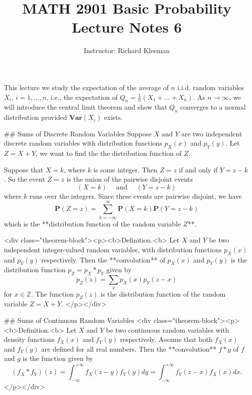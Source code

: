 


\title{MATH 2901 Basic Probability Lecture Notes 6}
\author{Instructor: Richard Kleeman}
\date{}
\maketitle


This lecture we study the expectation of the average of $n$ i.i.d. random variables $X_i$, $i=1,\dots, n$, i.e., the expectation of $Q_n = \frac{1}{n} (X_1 + \dots + X_n)$. As $n \to \infty$, we will introduce the central limit theorem and show that $Q_n$ converges to a normal distribution provided $\mathbf{Var}(X_i)$ exists.


## Sums of Discrete Random Variables
Suppose $X$ and $Y$ are two independent discrete random variables with distribution functions $p_X(x)$ and $p_Y(y)$. Let $Z = X + Y$, we want to find the the distribution function of $Z$. 

Suppose that $X = k$, where $k$ is some integer. Then $Z = z$ if and only if $Y = z-k$. So the event $Z = z$ is the union of the pairwise disjoint events
$$\begin{equation}
    (X=k) \quad  \text { and } \quad  (Y=z-k)
\end{equation}$$
where $k$ runs over the integers. Since these events are pairwise disjoint, we have
$$$$\begin{equation}
    \label{eq:6.1}
    \tag{6-1}
    \mathbf{P}(Z=z)=\sum_{k=-\infty}^{\infty} \mathbf{P}(X=k)  \mathbf{P}(Y=z-k)
\end{equation}$$$$
which is the **distribution function of the random variable $Z$**.

<div class="theorem-block"><p><b>Definition.<b> 
Let $X$ and $Y$ be two independent integer-valued random variables, with distribution functions $p_X(x)$ and $p_Y(y)$ respectively. Then the **convolution** of $p_X(x)$ and $p_Y(y)$ is the distribution function $p_Z = p_X * p_Y$ given by
$$\begin{equation}
    p_Z(z) = \sum_{x} p_X(x) p_Y(z-x)
\end{equation}$$
for $x\in \mathbb{Z}$. The function $p_Z(z)$ is the distribution function of the random variable $Z = X + Y$.
</p></div>


## Sums of Continuous Random Variables
<div class="theorem-block"><p><b>Definition.<b> 
Let $X$ and $Y$ be two continuous random variables with density functions $f_X(x)$ and $f_Y(y)$ respectively. Assume that both $f_X(x)$ and $f_Y(y)$ are defined for all real numbers. Then the **convolution** $f * g$ of $f$ and $g$ is the function given by
$$$$\begin{equation}
    \label{eq:6.2}
    \tag{6-2}
    (f_X * f_Y)(z) = \int_{-\infty}^{+\infty} f_X(z-y) f_Y(y) d y = \int_{-\infty}^{+\infty} f_Y(z-x) f_X(x) d x.
\end{equation}$$$$
</p></div>

